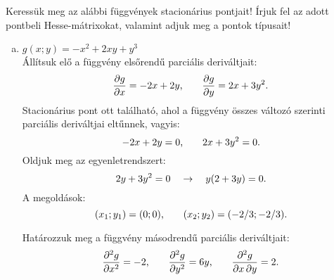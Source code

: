\begin{exercise}{%
    Keressük meg az alábbi függvények stacionárius pontjait! Írjuk fel az adott
    pontbeli Hesse-mátrixokat, valamint adjuk meg a pontok típusait!
  }
{\begin{enumerate}[a)]
\begin{enumerate}[1)]
              \item Most vizsgáljuk meg a mátrix determinánsát $(2/3; -2/3)$
                    pontban:
                    \[
                      \det \rmat H(2/3;-2/3) = \begin{vmatrix}
                        2 & 2 \\ 2 & 4
                      \end{vmatrix} = 4 \text.
                    \]
                    Mivel a determináns pozitív, ezért a stacionárius pont
                    egy lehetséges szélsőérték hely. Mivel a Hesse-mátrix
                    összes aldeterminánsa pozitív, ($\det \rmat H > 0$,
                    $h_{11} > 0$,) ezért ebben a pontban a függvénynek lokális
                    minimuma van.
            \end{enumerate}

            Összegezve tehát:
            \begin{alignat*}{9}
              f & (0  ; 0  )  &  & = 0 \quad     &  & \rightarrow \quad
              \text{nyeregpont,}
              \\
              f & (2/3; -2/3) &  & = -4/27 \quad &  & \rightarrow \quad
              \text{lokális minimum.}
            \end{alignat*}

      \item $g(x; y) = -x^2 + 2xy + y^3$\\[2mm]
            Állítsuk elő a függvény elsőrendű parciális deriváltjait:
            \[
              \pdv{g}{x} = -2x + 2y
              \text,
              \qquad
              \pdv{g}{y} = 2x + 3y^2
              \text.
            \]
            Stacionárius pont ott található, ahol a függvény összes változó
            szerinti parciális deriváltjai eltűnnek, vagyis:
            \[
              -2x + 2y = 0
              \text,
              \qquad
              2x + 3y^2 = 0
              \text.
            \]
            Oldjuk meg az egyenletrendszert:
            \[
              2y + 3y^2 = 0
              \quad \rightarrow \quad
              y(2 + 3y) = 0
              \text.
            \]
            A megoldások:
            \[
              (x_1; y_1) = (0; 0)
              \text, \qquad
              (x_2; y_2) = (-2/3; -2/3)
              \text.
            \]

            Határozzuk meg a függvény másodrendű parciális deriváltjait:
            \[
              \pdv[order=2]{g}{x} = -2 \text,
              \qquad
              \pdv[order=2]{g}{y} = 6y \text,
              \qquad
              \pdv{g}{x,y}        = 2 \text.
            \]


\end{enumerate}}
\end{exercise}
